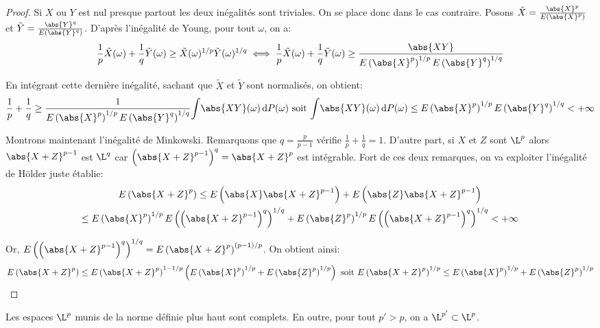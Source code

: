 \begin{proof}
Si $X$ ou $Y$ est nul presque partout les deux inégalités sont triviales. On se place donc dans le cas contraire. Posons $\tilde{X} = \frac{\abs{X}^p}{E\left (\abs{X}^p\right )}$ et $\tilde{Y} = \frac{\abs{Y}^q}{E\left (\abs{Y}^q\right )}$. D'après l'inégalité de Young, pour tout $\omega$, on a:
\[
\frac{1}{p} \tilde{X}(\omega) + \frac{1}{q} \tilde{Y}(\omega) \geq \tilde{X}(\omega)^{1/p}\tilde{Y}(\omega)^{1/q} \iff \frac{1}{p} \tilde{X}(\omega) + \frac{1}{q} \tilde{Y}(\omega) \geq \frac{\abs{XY}}{E\left (\abs{X}^p\right )^{1/p} E\left (\abs{Y}^q\right )^{1/q}}
\]

En intégrant cette dernière inégalité, sachant que $\tilde{X}$ et $\tilde{Y}$ sont normalisés, on obtient:
\[
\frac{1}{p} + \frac{1}{q} \geq \frac{1}{E \left (\abs{X}^p\right )^{1/p} E\left (\abs{Y}^q\right )^{1/q}}\displaystyle{\int} \abs{XY}(\omega) \, \mathrm d P(\omega) \text{ soit } \displaystyle{\int} \abs{XY}(\omega) \, \mathrm d P(\omega) \leq E \left (\abs{X}^p\right )^{1/p} E\left (\abs{Y}^q\right )^{1/q} < +\infty
\]

Montrons maintenant l'inégalité de Minkowski. Remarquons que $q = \frac{p}{p-1}$ vérifie $\frac{1}{p} + \frac{1}{q} = 1$. D'autre part, si $X$ et $Z$ sont $\L^p$ alors $\abs{X+Z}^{p-1}$ est $\L^q$ car $\left (\abs{X+Z}^{p-1}\right )^q = \abs{X+Z}^p$ est intégrable. Fort de ces deux remarques, on va exploiter l'inégalité de Hölder juste établie:
\begin{multline*}
E\left (\abs{X+Z}^p\right ) \leq E\left (\abs{X} \abs{X+Z}^{p-1}\right ) + E\left (\abs{Z} \abs{X+Z}^{p-1}\right ) \\
\leq E\left ( \abs{X}^p\right )^{1/p} E\left ( \left (\abs{X+Z}^{p-1}\right )^q\right )^{1/q} + E\left ( \abs{Z}^p\right )^{1/p} E\left ( \left (\abs{X+Z}^{p-1}\right )^q\right )^{1/q} < +\infty
 \end{multline*}


Or, $E\left ( \left (\abs{X+Z}^{p-1}\right )^q\right )^{1/q} = E\left ( \abs{X+Z}^p\right )^{(p-1)/p}$. On obtient ainsi:
\[
E\left (\abs{X+Z}^p\right ) \leq E\left ( \abs{X+Z}^p\right )^{1-1/p} \left (E\left ( \abs{X}^p\right )^{1/p} + E\left ( \abs{Z}^p\right )^{1/p} \right ) \text{ soit }E\left (\abs{X+Z}^p\right )^{1/p} \leq E\left ( \abs{X}^p\right )^{1/p} + E\left ( \abs{Z}^p\right )^{1/p}
\]
\end{proof}

\begin{prop}
Les espaces $\L^p$ munis de la norme définie plus haut sont complets. En outre, pour tout $p'>p$, on a $\L^{p'} \subset \L^p$.
\end{prop}

